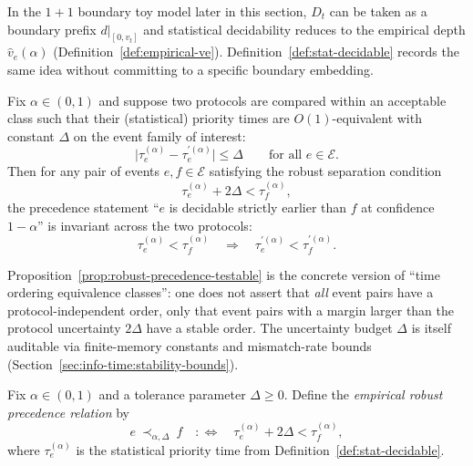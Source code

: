 \begin{remark}
In the $1\!+\!1$ boundary toy model later in this section, $D_t$ can be taken as a boundary prefix $d|_{[0,v_t]}$ and statistical decidability reduces to the empirical depth $\widehat v_e(\alpha)$ (Definition~\ref{def:empirical-ve}). Definition~\ref{def:stat-decidable} records the same idea without committing to a specific boundary embedding.
\end{remark}

\begin{proposition}\label{prop:robust-precedence-testable}
Fix $\alpha\in(0,1)$ and suppose two protocols are compared within an acceptable class such that their (statistical) priority times are $O(1)$-equivalent with constant $\Delta$ on the event family of interest:
\[
\bigl|\tau^{(\alpha)}_e-\tau^{\prime(\alpha)}_e\bigr|\le \Delta\qquad\text{for all }e\in\mathcal{E}.
\]
Then for any pair of events $e,f\in\mathcal{E}$ satisfying the robust separation condition
\[
\tau^{(\alpha)}_e+2\Delta<\tau^{(\alpha)}_f,
\]
the precedence statement ``$e$ is decidable strictly earlier than $f$ at confidence $1-\alpha$'' is invariant across the two protocols:
\[
\tau^{(\alpha)}_e<\tau^{(\alpha)}_f\quad\Longrightarrow\quad \tau^{\prime(\alpha)}_e<\tau^{\prime(\alpha)}_f.
\]
\end{proposition}

\begin{remark}
Proposition~\ref{prop:robust-precedence-testable} is the concrete version of ``time ordering equivalence classes'': one does not assert that \emph{all} event pairs have a protocol-independent order, only that event pairs with a margin larger than the protocol uncertainty $2\Delta$ have a stable order. The uncertainty budget $\Delta$ is itself auditable via finite-memory constants and mismatch-rate bounds (Section~\ref{sec:info-time:stability-bounds}).
\end{remark}

\begin{definition}\label{def:empirical-prec}
Fix $\alpha\in(0,1)$ and a tolerance parameter $\Delta\ge 0$.
Define the \emph{empirical robust precedence relation} by
\[
e\ \prec_{\alpha,\Delta}\ f
\quad:\Longleftrightarrow\quad
\tau^{(\alpha)}_e + 2\Delta < \tau^{(\alpha)}_f,
\]
where $\tau^{(\alpha)}_e$ is the statistical priority time from Definition~\ref{def:stat-decidable}.
\end{definition}

